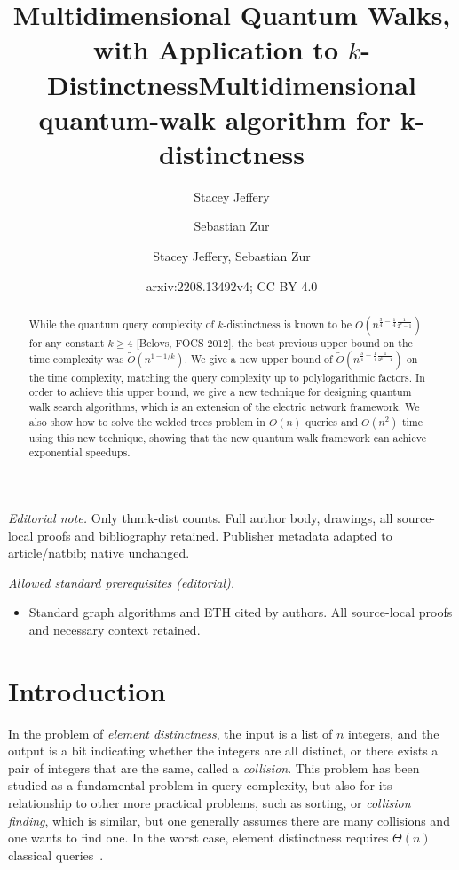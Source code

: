 \documentclass{article}
\author{Stacey Jeffery \and Sebastian Zur}\date{}
\title{Multidimensional Quantum Walks, with Application to \texorpdfstring{$k$}{k}-Distinctness}
\title{Multidimensional quantum-walk algorithm for k-distinctness}
\author{Stacey Jeffery, Sebastian Zur}
\date{arxiv:2208.13492v4; CC BY 4.0}
\renewcommand{\>}{\rangle}
\newcommand{\<}{\langle}
\renewcommand{\(}{\left(}
\renewcommand{\)}{\right)}
\begin{document}
\maketitle
\noindent\textit{Editorial note.} Only thm:k-dist counts. Full author body, drawings, all source-local proofs and bibliography retained. Publisher metadata adapted to article/natbib; native unchanged.\par\medskip
\noindent\textit{Allowed standard prerequisites (editorial).}\begin{itemize}
\item Standard graph algorithms and ETH cited by authors. All source-local proofs and necessary context retained.
\end{itemize}\medskip

\maketitle

\begin{abstract}
While the quantum query complexity of $k$-distinctness is known to be $O(n^{\frac{3}{4}-\frac{1}{4}\frac{1}{2^k-1}})$ for any constant $k\geq 4$ [Belovs, FOCS 2012], the best previous upper bound on the time complexity was $\widetilde{O}(n^{1-1/k})$. We give a new upper bound of $\widetilde{O}(n^{\frac{3}{4}-\frac{1}{4}\frac{1}{2^k-1}})$ on the time complexity, matching the query complexity up to polylogarithmic factors. In order to achieve this upper bound, we give a new technique for designing quantum walk search algorithms, which is an extension of the electric network framework. We also show how to solve the welded trees problem in $O(n)$ queries and $O(n^2)$ time using this new technique, showing that the new quantum walk framework can achieve exponential speedups.  
\end{abstract}

 

\section{Introduction}

In the problem of \emph{element distinctness}, the input is a list of $n$ integers, and the output is a bit indicating whether the integers are all distinct, or there exists a pair of integers that are the same, called a \emph{collision}. This problem has been studied as a fundamental problem in query complexity, but also for its relationship to other more practical problems, such as sorting, or \emph{collision finding}, which is similar, but one generally assumes there are many collisions and one wants to find one. In the worst case, element distinctness requires $\Theta(n)$ classical queries~\cite{ajtai2005EDlowerbound}. 
\end{document}
